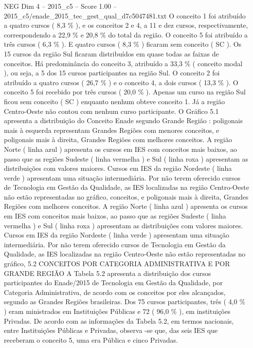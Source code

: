 \begin{textsample}{NEG Dim 4 – 2015\_c5 – Score 1.00 – 2015\_c5/enade\_2015\_tec\_gest\_qual\_d7c5047481.txt}
O conceito 1 foi atribuído a quatro cursos ( 8,3 \% ), e os conceitos 2 e 4, a 11 e dez cursos, respectivamente, correspondendo a 22,9 \% e 20,8 \% do total da região.
O conceito 5 foi atribuído a três cursos ( 6,3 \% ).
E quatro cursos ( 8,3 \% ) ficaram sem conceito ( SC ).
Os 15 cursos da região Sul ficaram distribuídos em quase todas as faixas de conceitos.
Há predominância do conceito 3, atribuído a 33,3 \% ( conceito modal ), ou seja, a 5 dos 15 cursos participantes na região Sul.
O conceito 2 foi atribuído a quatro cursos ( 26,7 \% ) e o conceito 4, a dois cursos ( 13,3 \% ).
O conceito 5 foi recebido por três cursos ( 20,0 \% ).
Apenas um curso na região Sul ficou sem conceito ( SC ) enquanto nenhum obteve conceito 1.
Já a região Centro-Oeste não contou com nenhum curso participante.
O Gráfico 5.1 apresenta a distribuição do Conceito Enade segundo Grande Região : poligonais mais à esquerda representam Grandes Regiões com menores conceitos, e poligonais mais à direita, Grandes Regiões com melhores conceitos.
A região Norte ( linha azul ) apresenta os cursos em IES com conceitos mais baixos, ao passo que as regiões Sudeste ( linha vermelha ) e Sul ( linha roxa ) apresentam as distribuições com valores maiores.
Cursos em IES da região Nordeste ( linha verde ) apresentam uma situação intermediária.
Por não terem oferecido cursos de Tecnologia em Gestão da Qualidade, as IES localizadas na região Centro-Oeste não estão representadas no gráfico, conceitos, e poligonais mais à direita, Grandes Regiões com melhores conceitos.
A região Norte ( linha azul ) apresenta os cursos em IES com conceitos mais baixos, ao passo que as regiões Sudeste ( linha vermelha ) e Sul ( linha roxa ) apresentam as distribuições com valores maiores.
Cursos em IES da região Nordeste ( linha verde ) apresentam uma situação intermediária.
Por não terem oferecido cursos de Tecnologia em Gestão da Qualidade, as IES localizadas na região Centro-Oeste não estão representadas no gráfico, 5.2 CONCEITOS POR CATEGORIA ADMINISTRATIVA E POR GRANDE REGIÃO A Tabela 5.2 apresenta a distribuição dos cursos participantes do Enade/2015 de Tecnologia em Gestão da Qualidade, por Categoria Administrativa, de acordo com os conceitos por eles alcançados, segundo as Grandes Regiões brasileiras.
Dos 75 cursos participantes, três ( 4,0 \% ) eram ministrados em Instituições Públicas e 72 ( 96,0 \% ), em instituições Privadas.
De acordo com as informações da Tabela 5.2, em termos nacionais, entre Instituições Públicas e Privadas, observa -se que, das seis IES que receberam o conceito 5, uma era Pública e cinco Privadas.

\end{textsample}
